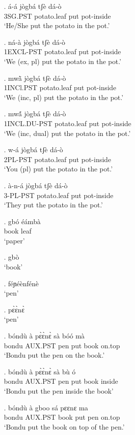 \documentclass{assets/fieldnotes}
\begin{document}
\exg. á-á jògbá tʃè dá-ò \\
3SG.PST potato.leaf put pot-inside \\
`He/She put the potato in the pot.'

\exg. ná-à jògbá tʃè dá-ò \\
1EXCL-PST potato.leaf put pot-inside \\
`We (ex, pl) put the potato in the pot.'

\exg. mwã̀ jògbá tʃè dá-ò \\
1INCl.PST potato.leaf put pot-inside \\
`We (inc, pl) put the potato in the pot.'

\exg. mwã́ jògbá tʃè dá-ò \\
1INCL.DU-PST potato.leaf put pot-inside \\
`We (inc, dual) put the potato in the pot.'

\exg. w-á jògbá tʃè dá-ò \\
2PL-PST potato.leaf put pot-inside \\
`You (pl) put the potato in the pot.'

\exg. à-n-á jògbá tʃè dá-ò \\
3-PL-PST potato.leaf put pot-inside \\
`They put the potato in the pot.'


\exg. gbó éámbà \\
book leaf \\
`paper'

\ex. gbò \\
`book'

\ex. féɲéènfénè \\
`pen'

\ex. pɛ̀ɛ̀nɛ̀ \\
`pen'

\exg. bóndù à pɛ̀ɛ̀nɛ̀ sà bóó mà \\
bondu AUX.PST pen put book on.top \\
`Bondu put the pen on the book.'

\exg. bóndù à pɛ̀ɛ̀nɛ̀ sà bù ó \\
bondu AUX.PST pen put book inside \\
`Bondu put the pen inside the book'

\exg. bóndù à gboo sá pɛɛnɛ ma \\
bondu AUX.PST book put pen on.top \\
`Bondu put the book on top of the pen.'
\end{document}
